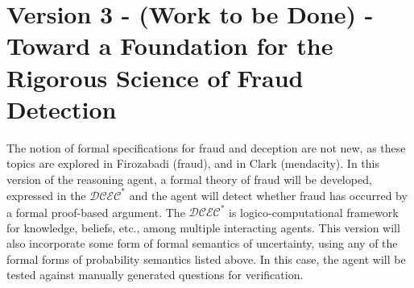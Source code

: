  
\chapter{Version 3 - (Work to be Done) - Toward a Foundation for the Rigorous Science of Fraud Detection}

The notion of formal specifications for fraud and deception are not new, as these topics are explored in Firozabadi \cite{firozabadi1999formal} (fraud), and in Clark \cite{Clark:2010:CIL:2019791} (mendacity).  In this version of the reasoning agent, a formal theory of 
fraud will be developed, expressed in the $\mathcal{DCEC}^\ast$ \cite{ka_sb_scc_seqcalc, mgmmm_ptai_sb} and the agent will detect whether fraud has occurred by
a formal proof-based argument.   The $\mathcal{DCEC}^\ast$ is logico-computational framework for 
knowledge, beliefs, etc., among multiple interacting agents.  This version will also incorporate some form of formal semantics of uncertainty, using any of the formal forms of probability semantics listed above.  In this case, the agent will be tested against manually generated questions for verification.

